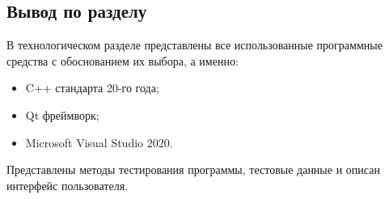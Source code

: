 \subsection{Вывод по разделу}
В технологическом разделе представлены все использованные программные средства с обоснованием их выбора, а именно:
\begin{itemize}
	\item C++ стандарта 20-го года;
	\item Qt фреймворк;
	\item Microsoft Visual Studio 2020.
\end{itemize}

Представлены методы тестирования программы, тестовые данные и описан интерфейс пользователя.

